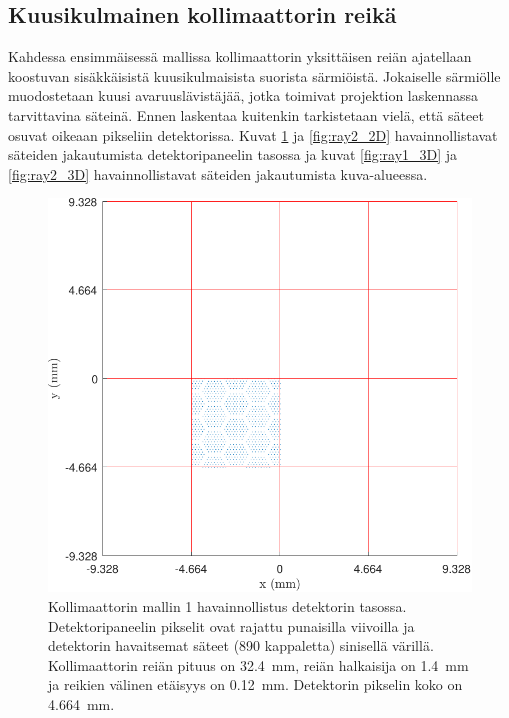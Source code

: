 \subsection{Kuusikulmainen kollimaattorin reikä}
Kahdessa ensimmäisessä mallissa kollimaattorin yksittäisen reiän ajatellaan koostuvan sisäkkäisistä kuusikulmaisista suorista särmiöistä. Jokaiselle särmiölle muodostetaan kuusi avaruuslävistäjää, jotka toimivat projektion laskennassa tarvittavina säteinä. Ennen laskentaa kuitenkin tarkistetaan vielä, että säteet osuvat oikeaan pikseliin detektorissa. Kuvat \ref{fig:ray1_2D} ja \ref{fig:ray2_2D} havainnollistavat säteiden jakautumista detektoripaneelin tasossa ja kuvat \ref{fig:ray1_3D} ja \ref{fig:ray2_3D} havainnollistavat säteiden jakautumista kuva-alueessa.

\begin{figure}[H]
    \centering
    \captionsetup{width=.9\linewidth}
    \includegraphics[width=.9\linewidth]{kuvat/malli1_2D.pdf}
    \caption{Kollimaattorin mallin 1 havainnollistus detektorin tasossa. Detektoripaneelin pikselit ovat rajattu punaisilla viivoilla ja detektorin havaitsemat säteet (890 kappaletta) sinisellä värillä. Kollimaattorin reiän pituus on \qty{32.4}{\milli\meter}, reiän halkaisija on \qty{1.4}{\milli\meter} ja reikien välinen etäisyys on \qty{0.12}{\milli\meter}. Detektorin pikselin koko on \qty{4.664}{\milli\meter}.}
    \label{fig:ray1_2D}
\end{figure}
